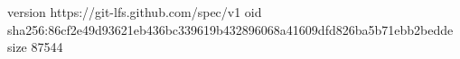 version https://git-lfs.github.com/spec/v1
oid sha256:86cf2e49d93621eb436bc339619b432896068a41609dfd826ba5b71ebb2bedde
size 87544
